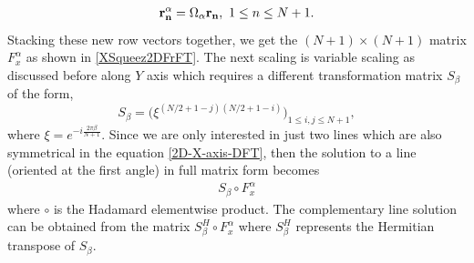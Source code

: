 \documentclass{UCF_ETD}
\begin{document}
 \begin{eqnarray*}
 {\bf r^{\alpha}_n } = \Omega_{\alpha} {\bf r_n }, \ 1 \leq n \leq N+1.
 \end{eqnarray*}
 Stacking these new row vectors together, we get the $(N+1)\times (N+1)$ matrix $F^{\alpha}_x$ as shown in \eqref{XSqueez2DFrFT}. The next scaling is variable scaling as discussed before along $Y$ axis which requires a different transformation matrix $S_{\beta}$ of the form,
 $$S_\beta=\Big (\xi^{(N/2+1-j)(N/2+1-i)}\Big)_{1\le i, j\le N+1},$$
 where
 $ \xi = e^{-i\frac{2\pi\beta }{N+1}}$.
 Since we are only interested in just two lines which are also symmetrical in the equation \eqref{2D-X-axis-DFT}, then the solution to a line (oriented at the first angle) in full matrix form becomes
 \begin{eqnarray*}
 S_{\beta} \circ F^{\alpha}_x
 \end{eqnarray*}
 where $\circ$ is the Hadamard elementwise product. The complementary line solution can be obtained from the matrix $S^H_{\beta} \circ F^{\alpha}_x$ where $S^H_{\beta}$ represents the  Hermitian transpose of $S_{\beta}$.
 
\end{document}
